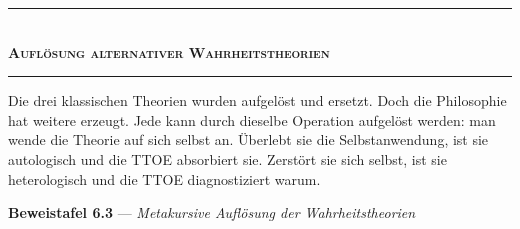 \documentclass[10pt, openany, oneside]{book}
\renewcommand{\normalsize}{\fontsize{10}{13}\selectfont}
\begin{document}
\vspace{1.5em}


\begin{center}
    \rule{0.3\textwidth}{0.4pt}\\[0.5em]
    {\normalsize\bfseries\scshape Auflösung alternativer Wahrheitstheorien}\\[0.3em]
    \rule{0.3\textwidth}{0.4pt}
\end{center}

\vspace{1em}

\noindent Die drei klassischen Theorien wurden aufgelöst und ersetzt. Doch die Philosophie hat weitere erzeugt. Jede kann durch dieselbe Operation aufgelöst werden: man wende die Theorie auf sich selbst an. Überlebt sie die Selbstanwendung, ist sie autologisch und die TTOE absorbiert sie. Zerstört sie sich selbst, ist sie heterologisch und die TTOE diagnostiziert warum.

\textbf{Beweistafel 6.3} --- \textit{Metakursive Auflösung der Wahrheitstheorien}

\vspace{0.5em}
\end{document}
